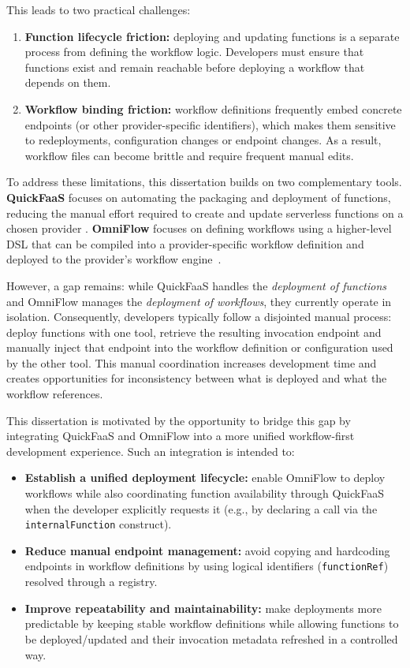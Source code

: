 This leads to two practical challenges:
\begin{enumerate}
	\item \textbf{Function lifecycle friction:} deploying and updating functions is a separate process from defining the workflow logic. Developers must ensure that functions exist and remain reachable before deploying a workflow that depends on them.
	\item \textbf{Workflow binding friction:} workflow definitions frequently embed concrete endpoints (or other provider-specific identifiers), which makes them sensitive to redeployments, configuration changes or endpoint changes. As a result, workflow files can become brittle and require frequent manual edits.
\end{enumerate}

To address these limitations, this dissertation builds on two complementary tools. \textbf{QuickFaaS} focuses on automating the packaging and deployment of functions, reducing the manual effort required to create and update serverless functions on a chosen provider \cite{rodrigues2022quickfaas}. \textbf{OmniFlow} focuses on defining workflows using a higher-level DSL that can be compiled into a provider-specific workflow definition and deployed to the provider's workflow engine~\cite{costa2023omniflow}.

However, a gap remains: while QuickFaaS handles the \textit{deployment of functions} and OmniFlow manages the \textit{deployment of workflows}, they currently operate in isolation. Consequently, developers typically follow a disjointed manual process: deploy functions with one tool, retrieve the resulting invocation endpoint and manually inject that endpoint into the workflow definition or configuration used by the other tool. This manual coordination increases development time and creates opportunities for inconsistency between what is deployed and what the workflow references.

This dissertation is motivated by the opportunity to bridge this gap by integrating QuickFaaS and OmniFlow into a more unified workflow-first development experience. Such an integration is intended to:
\begin{itemize}
	\item \textbf{Establish a unified deployment lifecycle:} enable OmniFlow to deploy workflows while also coordinating function availability through QuickFaaS when the developer explicitly requests it (e.g., by declaring a call via the \texttt{internalFunction} construct).
	\item \textbf{Reduce manual endpoint management:} avoid copying and hardcoding endpoints in workflow definitions by using logical identifiers (\texttt{functionRef}) resolved through a registry.
	\item \textbf{Improve repeatability and maintainability:} make deployments more predictable by keeping stable workflow definitions while allowing functions to be deployed/updated and their invocation metadata refreshed in a controlled way.
\end{itemize}

